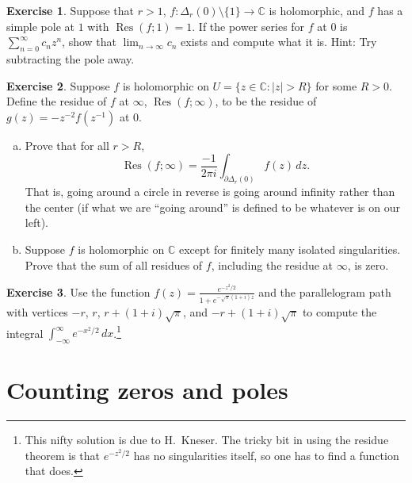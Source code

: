 \documentclass[12pt,openany]{book}
\newcommand{\sabs}[1]{\lvert {#1} \rvert}
\newcommand{\C}{{\mathbb{C}}}
\newcommand{\myquote}[1]{``#1''}
\theoremstyle{plain}
\theoremstyle{remark}
\theoremstyle{definition}
\newenvironment{exbox}{%
    \def\FrameCommand{\vrule width 1pt \relax\hspace{10pt}}%
    \MakeFramed{\advance\hsize-\width\FrameRestore}%
}{%
    \endMakeFramed
}
\newenvironment{exparts}{%
    \leavevmode\begin{enumerate}[a),noitemsep,topsep=0pt,parsep=0pt,partopsep=0pt]
}{%
    \end{enumerate}
}
\theoremstyle{exercise}
\newtheorem{exercise}{Exercise}[section]
\theoremstyle{example}
\begin{document}
\begin{savenotes}
\begin{exbox}
\begin{exercise}
Suppose that $r > 1$, $f \colon \Delta_r(0) \setminus \{ 1 \} \to \C$ is
holomorphic, and $f$ has a simple pole at $1$ with $\operatorname{Res}(f;1) = 1$.
If the power series for $f$ at $0$ is $\sum_{n=0}^\infty c_n z^n$, show that
$\lim_{n\to \infty} c_n$ exists and compute what it is.  Hint: Try
subtracting the pole away.
\end{exercise}

\begin{exercise}
Suppose $f$ is holomorphic on $U = \{ z \in \C : \sabs{z} > R \}$ for 
some $R > 0$.
Define the residue of $f$ at $\infty$,
$\operatorname{Res}(f;\infty)$, to be the residue
of $g(z) = -z^{-2} f(z^{-1})$ at $0$.
\begin{exparts}
\item
Prove that for all $r > R$,
\begin{equation*}
\operatorname{Res}(f;\infty) = \frac{-1}{2\pi i} \int_{\partial \Delta_r(0)}
f(z) \, dz .
\end{equation*}
That is, going around a circle in reverse is going around infinity rather
than the center (if what we are \myquote{going around} is defined to be whatever
is on our left).
\item
Suppose $f$ is holomorphic on $\C$ except for finitely many isolated
singularities.  Prove that the sum of all residues of $f$, including the
residue at $\infty$, is zero.
\end{exparts}
\end{exercise}

\begin{exercise}
Use the function $f(z) = \frac{e^{-z^2/2}}{1+e^{-\sqrt{\pi}(1+i)z}}$ and
the parallelogram path with vertices $-r$, $r$, $r+(1+i)\sqrt{\pi}$,
and $-r+(1+i)\sqrt{\pi}$
to compute the integral $\int_{-\infty}^\infty e^{-x^2/2} \, dx$.\footnote{%
This nifty solution is due to H.\ Kneser. The tricky bit in using the
residue theorem is that $e^{-z^2/2}$ has no singularities itself,
so one has to find a function that does.}
\end{exercise}
\end{exbox}
\end{savenotes}


\section{Counting zeros and poles}
\end{document}
